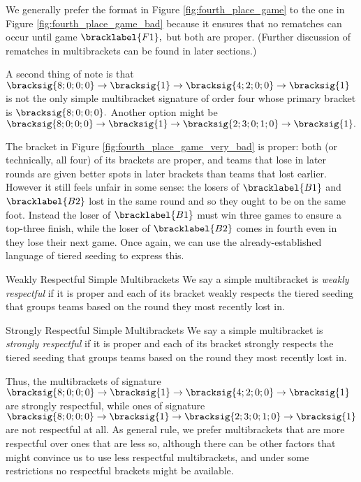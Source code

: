 {    We generally prefer the format in Figure \ref{fig:fourth_place_game} to the one in Figure \ref{fig:fourth_place_game_bad} because it ensures that no rematches can occur until game $\bracklabel{F1},$ but both are proper. (Further discussion of rematches in multibrackets can be found in later sections.)

    A second thing of note is that $\bracksig{8;0;0;0} \to \bracksig{1} \to \bracksig{4; 2; 0; 0} \to \bracksig{1}$ is not the only simple multibracket signature of order four whose primary bracket is $\bracksig{8;0;0;0}.$ Another option might be $\bracksig{8;0;0;0} \to \bracksig{1} \to \bracksig{2; 3; 0; 1; 0} \to \bracksig{1}.$


    The bracket in Figure \ref{fig:fourth_place_game_very_bad} is proper: both (or technically, all four) of its brackets are proper, and teams that lose in later rounds are given better spots in later brackets than teams that lost earlier. However it still feels unfair in some sense: the losers of $\bracklabel{B1}$ and $\bracklabel{B2}$ lost in the same round and so they ought to be on the same foot. Instead the loser of $\bracklabel{B1}$ must win three games to ensure a top-three finish, while the loser of $\bracklabel{B2}$ comes in fourth even in they lose their next game. Once again, we can use the already-established language of tiered seeding to express this.

    \begin{definition}{Weakly Respectful Simple Multibrackets}{}
        We say a simple multibracket is \textit{weakly respectful} if it is proper and each of its bracket weakly respects the tiered seeding that groups teams based on the round they most recently lost in.
    \end{definition}

    \begin{definition}{Strongly Respectful Simple Multibrackets}{}
        We say a simple multibracket is \textit{strongly respectful} if it is proper and each of its bracket strongly respects the tiered seeding that groups teams based on the round they most recently lost in.
    \end{definition}

    Thus, the multibrackets of signature $\bracksig{8;0;0;0} \to \bracksig{1} \to \bracksig{4; 2; 0; 0} \to \bracksig{1}$ are strongly respectful, while ones of signature $\bracksig{8;0;0;0} \to \bracksig{1} \to \bracksig{2; 3; 0; 1; 0} \to \bracksig{1}$ are not respectful at all. As general rule, we prefer multibrackets that are more respectful over ones that are less so, although there can be other factors that might convince us to use less respectful multibrackets, and under some restrictions no respectful brackets might be available.
}